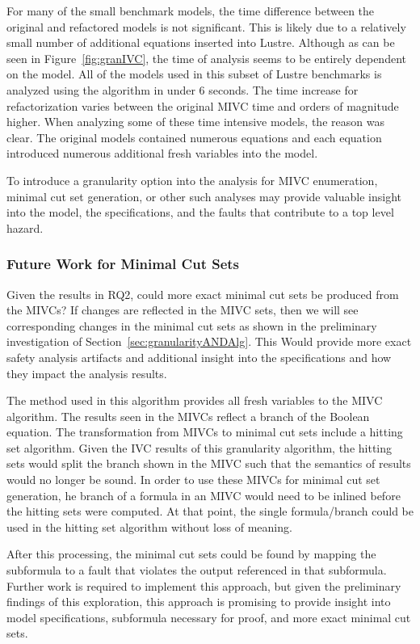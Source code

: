 For many of the small benchmark models, the time difference between the original and refactored models is not significant. This is likely due to a relatively small number of additional equations inserted into Lustre. Although as can be seen in Figure~\ref{fig:granIVC}, the time of analysis seems to be entirely dependent on the model. All of the models used in this subset of Lustre benchmarks is analyzed using the \aivcalg algorithm in under 6 seconds. The time increase for refactorization varies between the original MIVC time and orders of magnitude higher. When analyzing some of these time intensive models, the reason was clear. The original models contained numerous equations and each equation introduced numerous additional fresh variables into the model.

To introduce a granularity option into the analysis for MIVC enumeration, minimal cut set generation, or other such analyses may provide valuable insight into the model, the specifications, and the faults that contribute to a top level hazard. 

\subsubsection{Future Work for Minimal Cut Sets}
Given the results in RQ2, could more exact minimal cut sets be produced from the MIVCs? If changes are reflected in the MIVC sets, then we will see corresponding changes in the minimal cut sets as shown in the preliminary investigation of Section~\ref{sec:granularityANDAlg}. This Would provide more exact safety analysis artifacts and additional insight into the specifications and how they impact the analysis results.

The method used in this algorithm provides all fresh variables to the MIVC algorithm. The results seen in the MIVCs reflect a branch of the Boolean equation. The transformation from MIVCs to minimal cut sets include a hitting set algorithm. Given the IVC results of this granularity algorithm, the hitting sets would split the branch shown in the MIVC such that the semantics of results would no longer be sound. In order to use these MIVCs for minimal cut set generation, he branch of a formula in an MIVC would need to be inlined before the hitting sets were computed. At that point, the single formula/branch could be used in the hitting set algorithm without loss of meaning. 

After this processing, the minimal cut sets could be found by mapping the subformula to a fault that violates the output referenced in that subformula. Further work is required to implement this approach, but given the preliminary findings of this exploration, this approach is promising to provide insight into model specifications, subformula necessary for proof, and more exact minimal cut sets. 






